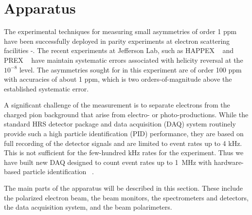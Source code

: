 
\section{Apparatus}\label{sec:apparatus}

\par The experimental techniques for measuring small 
asymmetries of order 1 ppm have been successfully deployed in
parity experiments at electron
scattering facilities \cite{SLAC}-\cite{happex}.
The recent experiments at Jefferson Lab, such as HAPPEX ~\cite{happex}
and PREX ~\cite{prex} have maintain systematic errors associated with helicity
reversal at the $10^{-8}$ level.
The asymmetries sought for in this experiment are of order 100 ppm with
accuracies of about 1 ppm, which is two orders-of-magnitude above the 
established systematic error.

A significant challenge of the measurement 
is to separate electrons from the charged pion background that arise from electro- or photo-productions. 
While the standard HRS detector package and data acquisition (DAQ) system routinely provide 
such a high particle identification (PID) performance, they are based on full recording 
of the detector signals and are limited to event rates up to 4 kHz.
This is not sufficient for the few-hundred kHz rates for the experiment. 
Thus we have built new DAQ designed to count event rates up to 1~MHz with hardware-based 
particle identification ~\cite{pvdis_nim}.

The main parts of the apparatus will be described in this section.
These include the polarized electron beam, the beam monitors, the spectrometers
and detectors, the data acquisition system, and the beam polarimeters.
